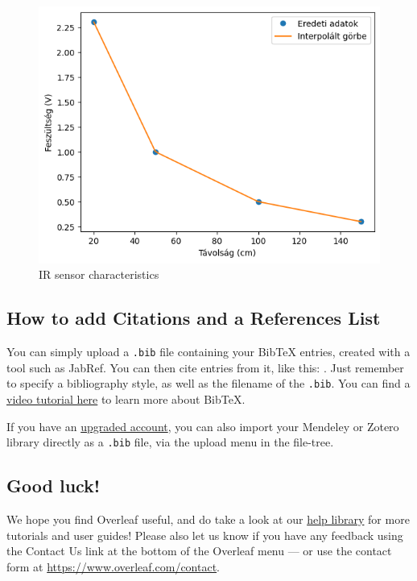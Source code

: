 \documentclass{article}
\begin{document}
\begin{figure}[H]
    \centering
    \includegraphics[scale=0.7]{Interp.png}
    \caption{\label{fig:korondi}IR sensor characteristics}
\end{figure}



\subsection{How to add Citations and a References List}

You can simply upload a \verb|.bib| file containing your BibTeX entries, created with a tool such as JabRef. You can then cite entries from it, like this: \cite{greenwade93}. Just remember to specify a bibliography style, as well as the filename of the \verb|.bib|. You can find a \href{https://www.overleaf.com/help/97-how-to-include-a-bibliography-using-bibtex}{video tutorial here} to learn more about BibTeX.

If you have an \href{https://www.overleaf.com/user/subscription/plans}{upgraded account}, you can also import your Mendeley or Zotero library directly as a \verb|.bib| file, via the upload menu in the file-tree.

\subsection{Good luck!}

We hope you find Overleaf useful, and do take a look at our \href{https://www.overleaf.com/learn}{help library} for more tutorials and user guides! Please also let us know if you have any feedback using the Contact Us link at the bottom of the Overleaf menu --- or use the contact form at \url{https://www.overleaf.com/contact}.



\end{document}
